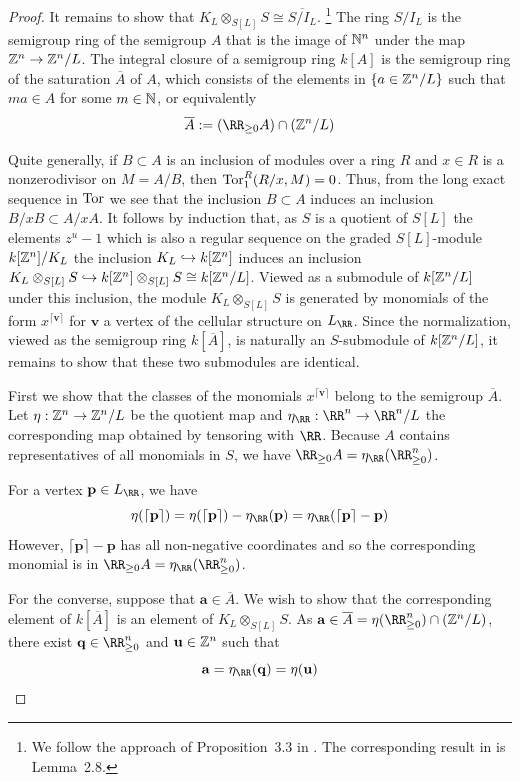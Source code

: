 \documentclass{amsart}
\begin{document}
\begin{proof}
It remains to show that $K_L \otimes_{S[L]} S \cong \overline{S/I_L}$. \footnote{We follow the approach of Proposition~3.3 in \cite{BCHS+25}. The corresponding result in \cite{BH25} is Lemma~2.8.}
The ring $S/I_L$ is the semigroup ring of the semigroup $A$ that is the image of $\mathbb N^n$ under the map $\mathbb Z^n \rightarrow \mathbb Z^n/L$. The integral closure of a semigroup ring $k[A]$ is the semigroup ring of the saturation $\overline{A}$ of $A$, which consists of the elements
in $\{a \in \mathbb Z^n/L\}$ such that  $ma\in A$ for some $m\in \mathbb N$, or equivalently \cite[***]{Eisenbud1995}
\[\overline{A} := (\RR_{\geq 0}A)\cap (\ZZ^n/L) \]

Quite generally, if $B\subset A$ is an inclusion of modules over a ring $R$ and $x\in R$ is a nonzerodivisor on $M = A/B$, then 
$\operatorname{Tor}_1^R(R/x, M)=0$. Thus, from the long exact sequence in $\operatorname{Tor}$ we see that the inclusion $B\subset A$
induces an inclusion $B/xB \subset A/xA$. It follows by induction that,
as $S$ is a quotient of $S[L]$ the elements $z^u-1$ which is also a regular sequence on the graded $S[L]$-module  $k[\mathbb Z^n]/K_L$ the inclusion $K_L\hookrightarrow k[\mathbb Z^n]$ induces an inclusion $K_L\otimes_{S[L]} S \hookrightarrow k[\mathbb Z^n]\otimes_{S[L]} S \cong k[\mathbb Z^n/L]$. Viewed as a submodule of $k[\mathbb Z^n/L]$ under this inclusion, the module $K_L\otimes_{S[L]} S$ is generated by monomials of the form $x^{\lceil \mathbf{v}\rceil}$ for $\mathbf{v}$ a vertex of the cellular structure on $L_{\RR}$. Since the normalization, viewed as the semigroup ring $k[\overline{A}]$, is naturally an $S$-submodule of $k[\mathbb Z^n/L]$, it remains to show that these two submodules are identical.

  First we show that the classes of the monomials $x^{\lceil \mathbf{v}\rceil}$ belong to the semigroup $\overline{A}$.
  Let $\eta:\mathbb Z^n\rightarrow \mathbb Z^n/L$ be the quotient map and $\eta_{\RR}:\RR^n\rightarrow \RR^n/L$ the corresponding map obtained by tensoring with $\RR$. 
  Because $A$ contains
  representatives of all monomials in $S$, we have $ \RR_{\geq 0} A=\eta_\RR(\RR_{\geq 0}^n)$.
  
  For a vertex $\mathbf{p}\in L_{\RR}$, we have
  \[
  \eta(\lceil \mathbf{p}\rceil) =
  \eta(\lceil \mathbf{p}\rceil)-\eta_{\RR}(\mathbf{p}) =
  \eta_\RR(\lceil \mathbf{p}\rceil - \mathbf{p})
  \]
  However, $\lceil \mathbf{p}\rceil - \mathbf{p}$ has all non-negative coordinates and so the corresponding monomial is in 
  $\RR_{\geq 0} A=\eta_\RR(\RR_{\geq 0}^n)$.

  For the converse, suppose that $\mathbf{a}\in \overline{A}$. We wish to show that the corresponding element of $k[\overline{A}]$ is an element of $K_L\otimes_{S[L]} S$.
  As $\mathbf{a}\in \overline{A} = \eta(\RR_{\geq 0}^n)\cap (\ZZ^n/L)$, there exist
  $\mathbf{q}\in \RR_{\geq 0}^n$ and $\mathbf{u}\in \mathbb Z^n$ such that
  \[\mathbf{a} = \eta_{\RR}(\mathbf{q}) = \eta(\mathbf{u})\]


\end{proof}
\end{document}
